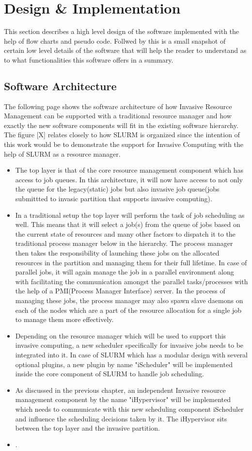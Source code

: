\documentclass[a4paper, 12pt]{article}
\begin{document}
\section{Design \& Implementation}
This section describes a high level design of the software implemented with the help of flow charts and pseudo code. Follwed by this is a small snapshot of certain low level details of the software that will help the reader to understand as to what functionalities this software offers in a summary.
\subsection{Software Architecture}
The following page shows the software architecture of how Invasive Resource Management can be supported with a traditional resource manager and how exactly the new software components will fit in the existing software hierarchy. The figure [X] relates closely to how SLURM is organized since the intention of this work would be to demonstrate the support for Invasive Computing with the help of SLURM as a resource manager.
\begin{itemize}
\item The top layer is that of the core resource management component which has access to job queues. In this architecture, it will now have access to not only the queue for the legacy(static) jobs but also invasive job queue(jobs submittted to invasic partition that supports invasive computing).
\item In a traditional setup the top layer will perform the task of job scheduling as well. This means that it will select a job(s) from the queue of jobs based on the current state of resources and many other factors to dispatch it to the traditional process manager below in the hierarchy. The process manager then takes the responsibility of launching these jobs on the allocated resources in the partition and managing them for their full lifetime. In case of parallel jobs, it will again manage the job in a parallel environment along with facilitating the communication amongst the parallel tasks/processes with the help of a PMI(Process Manager Interface) server. In the process of managing these jobs, the process manager may also spawn slave daemons on each of the nodes which are a part of the resource allocation for a single job to manage them more effectively.
\item Depending on the resource manager which will be used to support this invasive computing, a new scheduler specifically for invasive jobs needs to be integrated into it. In case of SLURM which has a modular design with several optional plugins, a new plugin by name "iScheduler" will be implemented inside the core component of SLURM to handle job scheduling.
\item As discussed in the previous chapter, an independent Invasive resource management component by the name "iHypervisor" will be implemented which needs to communicate with this new scheduling component iScheduler and influence the scheduling decisions taken by it. The iHypervisor sits between the top layer and the invasive partition.
\item .
\end{itemize}
\end{document}
